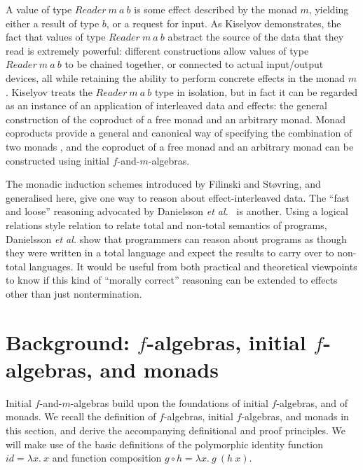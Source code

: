 \documentclass{jfp1}
\newcommand{\pattynote}[1]{\todo[inline, color=green!40]{#1}}
\begin{document}
A value of type $\mathit{Reader}~m~a~b$ is some effect described by
the monad $m$, yielding either a result of type $b$, or a request for
input. As Kiselyov demonstrates, the fact that values of type
$\mathit{Reader}~m~a~b$ abstract the source of the data that they read
is extremely powerful: different constructions allow values of type
$\mathit{Reader}~m~a~b$ to be chained together, or connected to actual
input/output devices, all while retaining the ability to perform
concrete effects in the monad $m$. Kiselyov treats the
$\mathit{Reader}~m~a~b$ type in isolation, but in fact it can be
regarded as an instance of an application of interleaved data and
effects: the general construction of the coproduct of a free monad and
an arbitrary monad. Monad coproducts provide a general and canonical
way of specifying the combination of two monads
\cite{luth02composing}, and the coproduct of a free monad and an
arbitrary monad can be constructed using initial $f$-and-$m$-algebras.

The monadic induction schemes introduced by Filinski and St\o{}vring,
and generalised here, \pattynote{Careful! Induction schemes not
  explicitly given} give one way to reason about effect-interleaved
data. The ``fast and loose'' reasoning advocated by Danielsson {\em et
  al.}~\cite{dan06} is another.  Using a logical relations style
relation to relate total and non-total semantics of programs,
Danielsson {\em et al.}  show that programmers can reason about
programs as though they were written in a total language and expect
the results to carry over to non-total languages.  It would be useful
from both practical and theoretical viewpoints to know if this kind of
``morally correct'' reasoning can be extended to effects other than
just nontermination.

\section{Background: \texorpdfstring{$f$}{f}-algebras, initial \texorpdfstring{$f$}{f}-algebras, and monads}
\label{sec:f-algebras}

Initial $f$-and-$m$-algebras build upon the foundations of initial
$f$-algebras, and of monads. We recall the definition of $f$-algebras,
initial $f$-algebras, and monads in this section, and derive the
accompanying definitional and proof principles. We will make use of
the basic definitions of the polymorphic identity function
$\mathit{id} = \lambda x.~x$ and function composition $g \circ h =
\lambda x.~g~(h~x)$.
\end{document}

